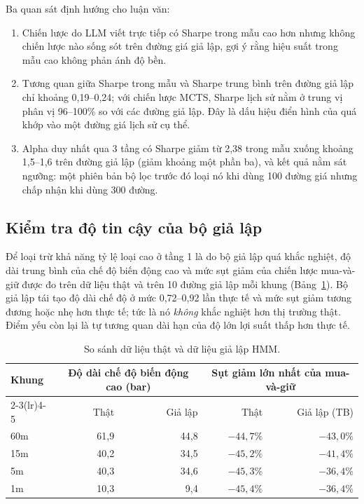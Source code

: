 \documentclass[12pt,a4paper]{article}
\begin{document}
Ba quan sát định hướng cho luận văn:
\begin{enumerate}
  \item Chiến lược do LLM viết trực tiếp có Sharpe trong mẫu cao hơn nhưng không chiến lược nào sống sót trên đường giá giả lập, gợi ý rằng hiệu suất trong mẫu cao không phản ánh độ bền.
  \item Tương quan giữa Sharpe trong mẫu và Sharpe trung bình trên đường giả lập chỉ khoảng 0,19–0,24; với chiến lược MCTS, Sharpe lịch sử nằm ở trung vị phân vị 96–100\% so với các đường giả lập. Đây là dấu hiệu điển hình của quá khớp vào một đường giá lịch sử cụ thể.
  \item Alpha duy nhất qua 3 tầng có Sharpe giảm từ 2,38 trong mẫu xuống khoảng 1,5--1,6 trên đường giả lập (giảm khoảng một phần ba), và kết quả nằm sát ngưỡng: một phiên bản bộ lọc trước đó loại nó khi dùng 100 đường giá nhưng chấp nhận khi dùng 300 đường.
\end{enumerate}

\subsection{Kiểm tra độ tin cậy của bộ giả lập}

Để loại trừ khả năng tỷ lệ loại cao ở tầng 1 là do bộ giả lập quá khắc nghiệt, độ dài trung bình của chế độ biến động cao và mức sụt giảm của chiến lược mua-và-giữ được đo trên dữ liệu thật và trên 10 đường giả lập mỗi khung (Bảng~\ref{tab:regime}). Bộ giả lập tái tạo độ dài chế độ ở mức 0,72–0,92 lần thực tế và mức sụt giảm tương đương hoặc nhẹ hơn thực tế; tức là nó \emph{không} khắc nghiệt hơn thị trường thật. Điểm yếu còn lại là tự tương quan dài hạn của độ lớn lợi suất thấp hơn thực tế.

\begin{table}[H]
\centering
\caption{So sánh dữ liệu thật và dữ liệu giả lập HMM.}
\label{tab:regime}
\begin{tabular}{lrrrr}
\toprule
Khung & \multicolumn{2}{c}{Độ dài chế độ biến động cao (bar)} & \multicolumn{2}{c}{Sụt giảm lớn nhất của mua-và-giữ} \\
\cmidrule(lr){2-3}\cmidrule(lr){4-5}
 & Thật & Giả lập & Thật & Giả lập (TB) \\
\midrule
60m & 61,9 & 44,8 & $-44{,}7\%$ & $-43{,}0\%$ \\
15m & 40,2 & 34,5 & $-45{,}2\%$ & $-41{,}4\%$ \\
5m  & 40,3 & 34,6 & $-45{,}3\%$ & $-36{,}4\%$ \\
1m  & 10,3 & 9,4  & $-45{,}4\%$ & $-36{,}4\%$ \\
\bottomrule
\end{tabular}
\end{table}
\end{document}
